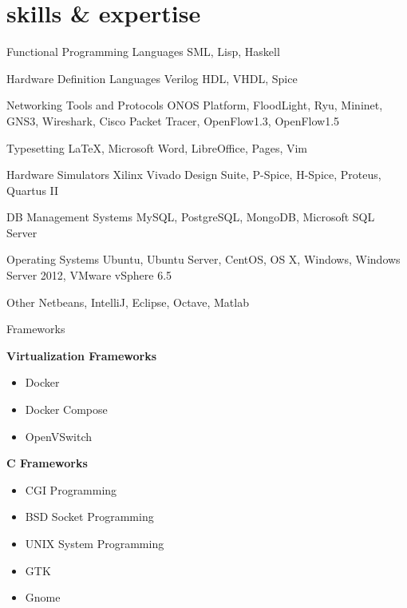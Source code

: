 \documentclass[]{friggeri-cv} %
\begin{document}
\section{skills \& expertise}

\begin{entrylist}

	\entry{\textcolor{TextGreen}{$\bullet$}}
	{Functional Programming Languages}
	{}
	{SML, Lisp, Haskell}


	\entry{\textcolor{TextOrange}{$\bullet$}}
	{Hardware Definition Languages}
	{}
	{Verilog HDL, VHDL, Spice}


	\entry{\textcolor{DarkBlue}{$\bullet$}}
	{Networking Tools and Protocols}
	{}
	{ONOS Platform, FloodLight, Ryu, Mininet, GNS3, Wireshark, Cisco Packet Tracer, OpenFlow1.3, OpenFlow1.5}


	\entry{\textcolor{Ocean}{$\bullet$}}
	{Typesetting}
	{}
	{\LaTeX, Microsoft Word, LibreOffice, Pages, Vim}


	\entry{\textcolor{LightGray}{$\bullet$}}
	{Hardware Simulators}
	{}
	{Xilinx Vivado Design Suite, P-Spice, H-Spice, Proteus, Quartus II}


	\entry{\textcolor{TextYellow}{$\bullet$}}
	{DB Management Systems}
	{}
	{MySQL, PostgreSQL, MongoDB, Microsoft SQL Server}


	\entry{\textcolor{TextRed}{$\bullet$}}
	{Operating Systems}
	{}
	{Ubuntu, Ubuntu Server, CentOS, OS X, Windows, Windows Server 2012, VMware vSphere 6.5}


	\entry{\textcolor{TextPink}{$\bullet$}}
	{Other}
	{}
	{Netbeans, IntelliJ, Eclipse, Octave, Matlab}


	\entry{\textcolor{UniBlue}{$\bullet$}}
	{Frameworks}
	{}
	{
		\textbf{Virtualization Frameworks}
		\begin{itemize}
			\item Docker
			\item Docker Compose
			\item OpenVSwitch
		\end{itemize}
		\textbf{C Frameworks}
		\begin{itemize}
			\item CGI Programming
			\item BSD Socket Programming
			\item UNIX System Programming
			\item GTK
			\item Gnome
		\end{itemize}
	
}
\end{entrylist}
\end{document}
